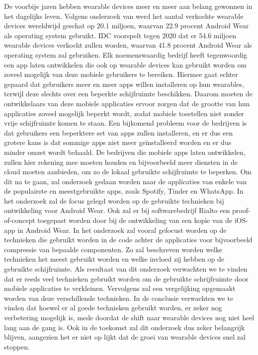 De voorbije jaren hebben wearable devices meer en meer aan belang gewonnen in het dagelijks leven. Volgens onderzoek van \cite{IDC} werd het aantal verkochte wearable devices wereldwijd geschat op 20.1 miljoen, waarvan 22.9 procent Android Wear als operating system gebruikt. IDC voorspelt tegen 2020 dat er 54.6 miljoen wearable devices verkocht zullen worden, waarvan 41.8 procent Android Wear als operating system zal gebruiken. Elk noemenswaardig bedrijf heeft tegenwoordig een app laten ontwikkelen die ook op wearable devices kan gebruikt worden om zoveel mogelijk van deze mobiele gebruikers te bereiken. Hiermee gaat echter gepaard dat gebruikers meer en meer apps willen installeren op hun wearables, terwijl deze slechts over een beperkte schijfruimte beschikken. Daarom moeten de ontwikkelaars van deze mobiele applicaties ervoor zorgen dat de grootte van hun applicaties zoveel mogelijk beperkt wordt, zodat mobiele toestellen niet zonder vrije schijfruimte komen te staan. Een bijkomend probleem voor de bedrijven is dat gebruikers een beperktere set van apps zullen installeren, en er dus een grotere kans is dat sommige apps niet meer geïnstalleerd worden en er dus minder omzet wordt behaald. De bedrijven die mobiele apps laten ontwikkelen, zullen hier rekening mee moeten houden en bijvoorbeeld meer diensten in de cloud moeten aanbieden, om zo de lokaal gebruikte schijfruimte te beperken. Om dit na te gaan, zal onderzoek gedaan worden naar de applicaties van enkele van de populairste en meestgebruikte apps, zoals Spotify, Tinder en WhatsApp. In het onderzoek zal de focus gelegd worden op de gebruikte technieken bij ontwikkeling voor Android Wear. Ook zal er bij softwarebedrijf Rialto een proof-of-concept toegepast worden door bij de ontwikkeling van een kopie van de iOS-app in Android Wear. In het onderzoek zal vooral gefocust worden op de technieken die gebruikt worden in de code achter de applicaties voor bijvoorbeeld compressie van bepaalde componenten. Zo zal beschreven worden welke technieken het meest gebruikt worden en welke invloed zij hebben op de gebruikte schijfruimte. Als resultaat van dit onderzoek verwachten we te vinden dat er reeds veel technieken gebruikt worden om de gebruikte schrijfruimte door mobiele applicaties te verkleinen. Vervolgens zal een vergelijking opgemaakt worden van deze verschillende technieken. In de conclusie verwachten we te vinden dat hoewel er al goede technieken gebruikt worden, er zeker nog verbetering mogelijk is, mede doordat de shift naar wearable devices nog niet heel lang aan de gang is. Ook in de toekomst zal dit onderzoek dus zeker belangrijk blijven, aangezien het er niet op lijkt dat de groei van wearable devices snel zal stoppen. 
